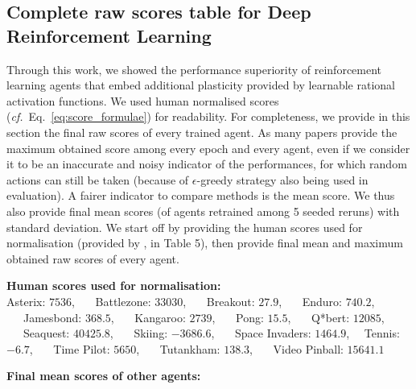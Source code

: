 \documentclass[accepted]{article}
\theoremstyle{plain}
\theoremstyle{definition}
\theoremstyle{remark}
\newcommand{\cf}{\emph{cf.}~}
\begin{document}
\subsection{Complete raw scores table for Deep Reinforcement Learning}
\label{app:all_scores_tables}
Through this work, we showed the performance superiority of reinforcement learning agents that embed additional plasticity provided by learnable rational activation functions. We used human normalised scores (\cf Eq.~\ref{eq:score_formulae}) for readability. For completeness, we provide in this section the final raw scores of every trained agent. As many papers provide the maximum obtained score among every epoch and every agent, even if we consider it to be an inaccurate and noisy indicator of the performances, for which random actions can still be taken (because of $\epsilon$-greedy strategy also being used in evaluation). A fairer indicator to compare methods is the mean score. We thus also provide final mean scores (of agents retrained among 5 seeded reruns) with standard deviation. We start off by providing the human scores used for normalisation (provided by \citeauthor{van2016deep}, in Table 5), then provide final mean and maximum obtained raw scores of every agent.

\textbf{Human scores used for normalisation:}\\
Asterix: $7536$, \ \ \ Battlezone: $33030$, \ \ \ Breakout: $27.9$, \ \ \ Enduro: $740.2$, \ \ \ Jamesbond: $368.5$, \ \ \ Kangaroo: $2739$, \ \ \ Pong: $15.5$, \ \ \ Q*bert: $12085$, \ \ \ Seaquest: $40425.8$, \ \ \ Skiing: $-3686.6$, \ \ \ Space Invaders: $1464.9$, \ \ Tennis: $-6.7$,  \ \ \ Time Pilot: $5650$,  \ \ \ Tutankham: $138.3$,  \ \ \ Video Pinball: $15641.1$

\newpage
\textbf{Final mean scores of other agents:}
\end{document}
